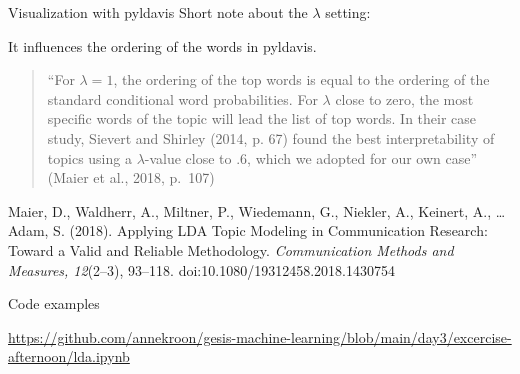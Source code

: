 \documentclass[handout]{beamer}
\begin{document}

\begin{frame}{Visualization with pyldavis}
	Short note about the $\lambda$ setting:
	
	It influences the ordering of the words in pyldavis.
	
	\begin{quote}
		``For $\lambda = 1$, the ordering of the top words is equal to the ordering of the standard conditional word probabilities. For $\lambda$ close to zero, the most specific words of the topic will lead the list of top words. In their case study, Sievert and Shirley (2014, p. 67) found the best interpretability of topics using a  $\lambda$-value close to .6, which we adopted for our own case'' (Maier et al., 2018, p.~107)
	\end{quote}
	
	
	\tiny{Maier, D., Waldherr, A., Miltner, P., Wiedemann, G., Niekler, A., Keinert, A., \ldots Adam, S. (2018). Applying LDA Topic Modeling in Communication Research: Toward a Valid and Reliable Methodology. \textit{Communication Methods and Measures, 12}(2--3), 93--118. doi:10.1080/19312458.2018.1430754}
\end{frame}

\begin{frame}[plain]{Code examples}
	
	
	\url{https://github.com/annekroon/gesis-machine-learning/blob/main/day3/excercise-afternoon/lda.ipynb}
\end{frame}
\end{document}
